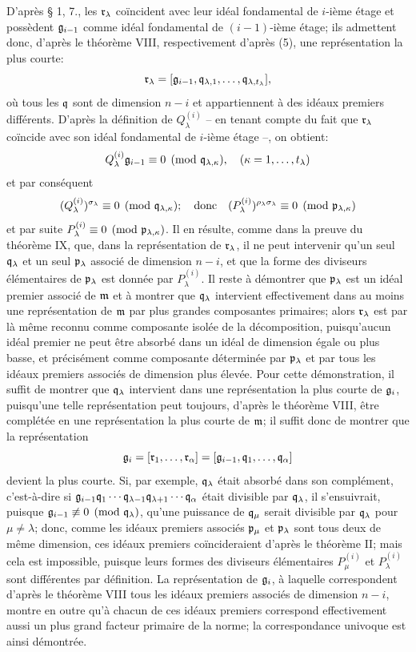 D'après \S{} 1, 7., les $\mathfrak r_\lambda$ coïncident avec leur idéal fondamental de $i$-ième étage et possèdent $\mathfrak g_{i-1}$ comme idéal fondamental de $(i-1)$-ième étage; ils admettent donc, d'après le théorème VIII, respectivement d'après (5), une représentation la plus courte:
\[
 \mathfrak r_\lambda=[\mathfrak g_{i-1},\mathfrak q_{\lambda,1},\ldots,\mathfrak q_{\lambda,t_\lambda}],
\]
où tous les $\mathfrak q$ sont de dimension $n-i$ et appartiennent à des idéaux premiers différents. D'après la définition de $Q_\lambda^{(i)}$ -- en tenant compte du fait que $\mathfrak r_\lambda$ coïncide avec son idéal fondamental de $i$-ième étage --, on obtient:
\[
 Q_\lambda^{(i)}\mathfrak g_{i-1}\equiv0\pmod{\mathfrak q_{\lambda,\kappa}},
 \quad(\kappa=1,\ldots,t_\lambda)
\]
et par conséquent
\[
 (Q_\lambda^{(i)})^{\sigma_\lambda}\equiv0\pmod{\mathfrak q_{\lambda,\kappa}};
 \quad\hbox{donc}\quad
 (P_\lambda^{(i)})^{\rho_\lambda\sigma_\lambda}\equiv0\pmod{\mathfrak p_{\lambda,\kappa}}
\]
et par suite $P_\lambda^{(i)}\equiv0\pmod{\mathfrak p_{\lambda,\kappa}}$. Il en résulte, comme dans la preuve du théorème IX, que, dans la représentation de $\mathfrak r_\lambda$, il ne peut intervenir qu'un seul $\mathfrak q_\lambda$ et un seul $\mathfrak p_\lambda$ associé de dimension $n-i$, et que la forme des diviseurs élémentaires de $\mathfrak p_\lambda$ est donnée par $P_\lambda^{(i)}$. Il reste à démontrer que $\mathfrak p_\lambda$ est un idéal premier associé de $\mathfrak m$ et à montrer que $\mathfrak q_\lambda$ intervient effectivement dans au moins une représentation de $\mathfrak m$ par plus grandes composantes primaires; alors $\mathfrak r_\lambda$ est par là même reconnu comme composante isolée de la décomposition, puisqu'aucun idéal premier ne peut être absorbé dans un idéal de dimension égale ou plus basse, et précisément comme composante déterminée par $\mathfrak p_\lambda$ et par tous les idéaux premiers associés de dimension plus élevée. Pour cette démonstration, il suffit de montrer que $\mathfrak q_\lambda$ intervient dans une représentation la plus courte de $\mathfrak g_i$, puisqu'une telle représentation peut toujours, d'après le théorème VIII, être complétée en une représentation la plus courte de $\mathfrak m$; il suffit donc de montrer que la représentation
\[
 \mathfrak g_i=[\mathfrak r_1,\ldots,\mathfrak r_\alpha]=[\mathfrak g_{i-1},\mathfrak q_1,\ldots,\mathfrak q_\alpha]
\]
devient la plus courte. Si, par exemple, $\mathfrak q_\lambda$ était absorbé dans son complément, c'est-à-dire si $\mathfrak g_{i-1}\mathfrak q_1\cdots\mathfrak q_{\lambda-1}\mathfrak q_{\lambda+1}\cdots\mathfrak q_\alpha$ était divisible par $\mathfrak q_\lambda$, il s'ensuivrait, puisque $\mathfrak g_{i-1}\not\equiv0\pmod{\mathfrak q_\lambda}$, qu'une puissance de $\mathfrak q_\mu$ serait divisible par $\mathfrak q_\lambda$ pour $\mu\ne\lambda$; donc, comme les idéaux premiers associés $\mathfrak p_\mu$ et $\mathfrak p_\lambda$ sont tous deux de même dimension, ces idéaux premiers coïncideraient d'après le théorème II; mais cela est impossible, puisque leurs formes des diviseurs élémentaires $P_\mu^{(i)}$ et $P_\lambda^{(i)}$ sont différentes par définition. La représentation de $\mathfrak g_i$, à laquelle correspondent d'après le théorème VIII tous les idéaux premiers associés de dimension $n-i$, montre en outre qu'à chacun de ces idéaux premiers correspond effectivement aussi un plus grand facteur primaire de la norme; la correspondance univoque est ainsi démontrée.

